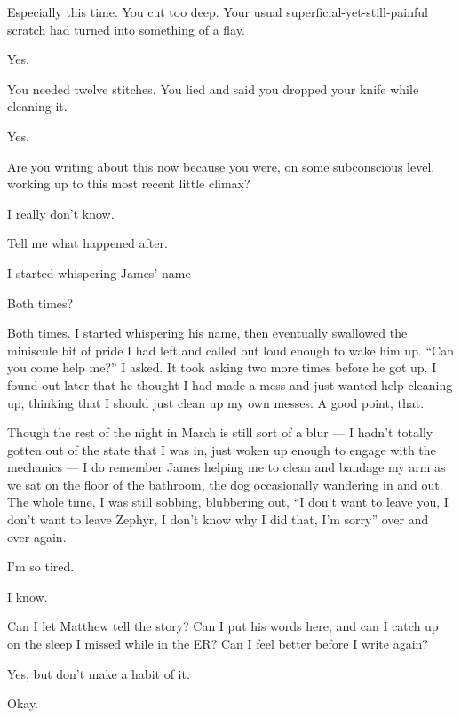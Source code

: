 \begin{ally}
Especially this time. You cut too deep. Your usual superficial-yet-still-painful scratch had turned into something of a flay.
\end{ally}
Yes.

\begin{ally}
You needed twelve stitches. You lied and said you dropped your knife while cleaning it.
\end{ally}
Yes.

\begin{ally}
Are you writing about this now because you were, on some subconscious level, working up to this most recent little climax?
\end{ally}
I really don't know.

\begin{ally}
Tell me what happened after.
\end{ally}
I started whispering James' name--

\begin{ally}
Both times?
\end{ally}
Both times. I started whispering his name, then eventually swallowed the miniscule bit of pride I had left and called out loud enough to wake him up. ``Can you come help me?'' I asked. It took asking two more times before he got up. I found out later that he thought I had made a mess and just wanted help cleaning up, thinking that I should just clean up my own messes. A good point, that.

Though the rest of the night in March is still sort of a blur --- I hadn't totally gotten out of the state that I was in, just woken up enough to engage with the mechanics --- I do remember James helping me to clean and bandage my arm as we sat on the floor of the bathroom, the dog occasionally wandering in and out. The whole time, I was still sobbing, blubbering out, ``I don't want to leave you, I don't want to leave Zephyr, I don't know why I did that, I'm sorry'' over and over again.
\newpage

\noindent I'm so tired.

\begin{ally}
I know.
\end{ally}
Can I let Matthew tell the story? Can I put his words here, and can I catch up on the sleep I missed while in the ER? Can I feel better before I write again?

\begin{ally}
Yes, but don't make a habit of it.
\end{ally}
Okay.

